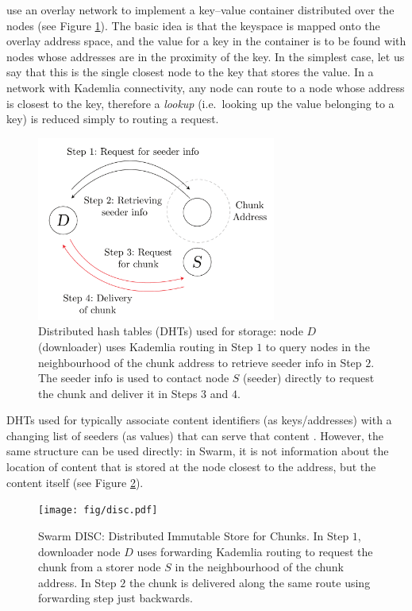  use an overlay network to implement a key--value container distributed over the nodes (see Figure \ref{fig:DHT}). The basic idea is that the keyspace is mapped onto the overlay address space, and the value for a key in the container is to be found with nodes whose addresses are in the proximity of the key. In the simplest case, let us say that this is the single closest node to the key that stores the value. In a network with Kademlia connectivity, any node can route to a node whose address is closest to the key, therefore a \emph{lookup} (i.e.\ looking up the value belonging to a key) is reduced simply to routing a request. 

\begin{figure}[htbp]
   \centering
   \includegraphics[width=0.7\textwidth]{fig/dht.pdf}
   \caption[Distributed hash tables (DHTs) \statusgreen]{Distributed hash tables (DHTs) used for storage:  node $D$ (downloader) uses Kademlia routing in Step $1$ to query nodes in the neighbourhood of the chunk address to retrieve seeder info in Step $2$. The seeder info is used to contact node $S$ (seeder) directly to request the chunk and deliver it in Steps $3$ and $4$.}
   \label{fig:DHT}
\end{figure}

DHTs used for  typically associate content identifiers (as keys/addresses) with a changing list of seeders (as values) that can serve that content \cite{ipfs2014, crosby2007analysis}. However, the same structure can be used directly: in Swarm, it is not information about the location of content that is stored at the node closest to the address, but the content itself (see Figure \ref{fig:disc}). 


\begin{figure}[htbp]
   \centering
   \texttt{[image: fig/disc.pdf]}
   \caption[Swarm DISC: Distributed Immutable Store for Chunks \statusgreen]{Swarm DISC:  Distributed Immutable Store for Chunks. In Step $1$, downloader node $D$ uses forwarding Kademlia routing to request the chunk from a storer node $S$ in the neighbourhood of the chunk address. In Step $2$ the chunk is delivered along the same route using forwarding step just backwards.}
   \label{fig:disc}
\end{figure}

